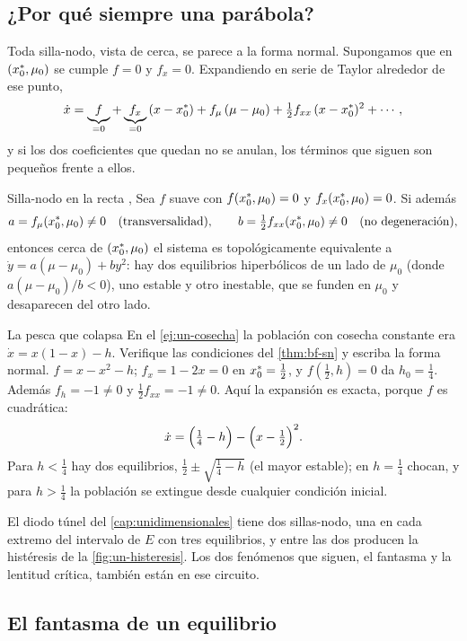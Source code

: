 \subsection*{¿Por qué siempre una parábola?}

Toda silla-nodo, vista de cerca, se parece a la forma normal. Supongamos que en $(x^{*}_0,\mu_0)$ se cumple $f=0$ y $f_x=0$. Expandiendo en serie de Taylor alrededor de ese punto,
\[
  \dot x=\underbrace{f}_{=0}+\underbrace{f_x}_{=0}\,(x-x^{*}_0)+f_\mu\,(\mu-\mu_0)+\tfrac12f_{xx}\,(x-x^{*}_0)^2+\cdots ,
\]
y si los dos coeficientes que quedan no se anulan, los términos que siguen son pequeños frente a ellos.

\begin{teorema}[label=thm:bf-sn]{Silla-nodo en la recta \citep[\S3.1]{Str15}, \citep[\S3.2]{Kuz04}}
Sea $f$ suave con $f(x^{*}_0,\mu_0)=0$ y $f_x(x^{*}_0,\mu_0)=0$. Si además
\[
  a=f_\mu(x^{*}_0,\mu_0)\neq0\quad\text{(transversalidad)},\qquad b=\tfrac12f_{xx}(x^{*}_0,\mu_0)\neq0\quad\text{(no degeneración)},
\]
entonces cerca de $(x^{*}_0,\mu_0)$ el sistema es topológicamente equivalente a $\dot y=a(\mu-\mu_0)+by^2$: hay dos equilibrios hiperbólicos de un lado de $\mu_0$ (donde $a(\mu-\mu_0)/b<0$), uno estable y otro inestable, que se funden en $\mu_0$ y desaparecen del otro lado.
\end{teorema}

\begin{ejemplo}[label=ej:bf-cosecha]{La pesca que colapsa}
En el \cref{ej:un-cosecha} la población con cosecha constante era $\dot x=x(1-x)-h$. Verifique las condiciones del \cref{thm:bf-sn} y escriba la forma normal.
\solucion $f=x-x^2-h$; $f_x=1-2x=0$ en $x^{*}_0=\tfrac12$, y $f(\tfrac12,h)=0$ da $h_0=\tfrac14$. Además $f_h=-1\neq0$ y $\tfrac12f_{xx}=-1\neq0$. Aquí la expansión es exacta, porque $f$ es cuadrática:
\[
  \dot x=\Bigl(\tfrac14-h\Bigr)-\Bigl(x-\tfrac12\Bigr)^2 .
\]
Para $h<\tfrac14$ hay dos equilibrios, $\tfrac12\pm\sqrt{\tfrac14-h}$ (el mayor estable); en $h=\tfrac14$ chocan, y para $h>\tfrac14$ la población se extingue desde cualquier condición inicial.
\end{ejemplo}

El diodo túnel del \cref{cap:unidimensionales} tiene dos sillas-nodo, una en cada extremo del intervalo de $E$ con tres equilibrios, y entre las dos producen la histéresis de la \cref{fig:un-histeresis}. Los dos fenómenos que siguen, el fantasma y la lentitud crítica, también están en ese circuito.

\subsection*{El fantasma de un equilibrio}

